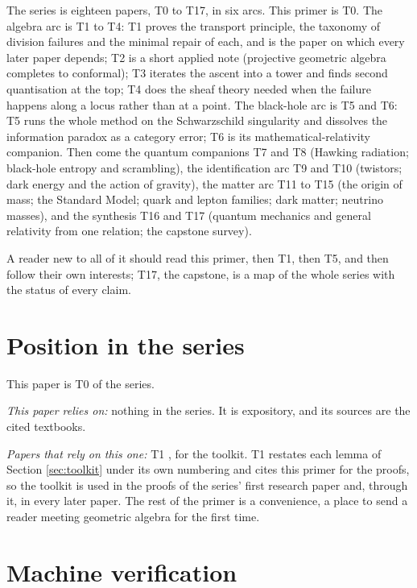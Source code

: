 \documentclass[11pt]{article}
\theoremstyle{plain}
\theoremstyle{definition}
\begin{document}
The series is eighteen papers, T0 to T17, in six arcs. This primer is T0. The algebra arc is T1 to T4: T1 proves the transport principle, the taxonomy of division failures and the minimal repair of each, and is the paper on which every later paper depends; T2 is a short applied note (projective geometric algebra completes to conformal); T3 iterates the ascent into a tower and finds second quantisation at the top; T4 does the sheaf theory needed when the failure happens along a locus rather than at a point. The black-hole arc is T5 and T6: T5 runs the whole method on the Schwarzschild singularity and dissolves the information paradox as a category error; T6 is its mathematical-relativity companion. Then come the quantum companions T7 and T8 (Hawking radiation; black-hole entropy and scrambling), the identification arc T9 and T10 (twistors; dark energy and the action of gravity), the matter arc T11 to T15 (the origin of mass; the Standard Model; quark and lepton families; dark matter; neutrino masses), and the synthesis T16 and T17 (quantum mechanics and general relativity from one relation; the capstone survey).

A reader new to all of it should read this primer, then T1, then T5, and then follow their own interests; T17, the capstone, is a map of the whole series with the status of every claim.

\section{Position in the series}\label{sec:position}

This paper is T0 of the series.

\emph{This paper relies on:} nothing in the series. It is expository, and its sources are the cited textbooks.

\emph{Papers that rely on this one:} T1 \cite{ButlerT1}, for the toolkit. T1 \cite{ButlerT1} restates each lemma of Section \ref{sec:toolkit} under its own numbering and cites this primer for the proofs, so the toolkit is used in the proofs of the series' first research paper and, through it, in every later paper. The rest of the primer is a convenience, a place to send a reader meeting geometric algebra for the first time.

\section{Machine verification}\label{sec:verification}
\end{document}
